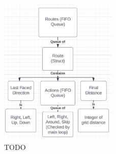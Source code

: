 \documentclass[conference]{IEEEtran}
\begin{document}
\begin{figure}[htbp]
	\centerline{\includegraphics[width=0.5\textwidth]{pathfinding-route-struct.png}}
	\caption{TODO}
	\label{fig:pathfinding-route-struct}
\end{figure}
\end{document}
